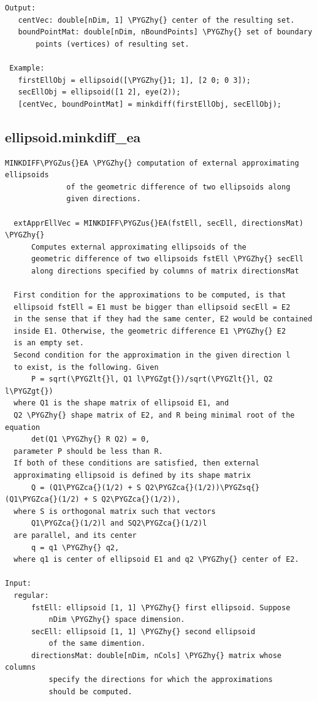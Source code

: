 \documentclass[letterpaper,10pt,english]{sphinxmanual}
\def\PYGZus{\char`\_}
\def\PYGZca{\char`\^}
\def\PYGZlt{\char`\<}
\def\PYGZgt{\char`\>}
\def\PYGZhy{\char`\-}
\def\PYGZsq{\char`\'}
\begin{document}
\begin{Verbatim}[commandchars=\\\{\}]
 Output:
   centVec: double[nDim, 1] \PYGZhy{} center of the resulting set.
   boundPointMat: double[nDim, nBoundPoints] \PYGZhy{} set of boundary
       points (vertices) of resulting set.

 Example:
   firstEllObj = ellipsoid([\PYGZhy{}1; 1], [2 0; 0 3]);
   secEllObj = ellipsoid([1 2], eye(2));
   [centVec, boundPointMat] = minkdiff(firstEllObj, secEllObj);
\end{Verbatim}


\subsection{ellipsoid.minkdiff\_ea}
\label{chap_functions:ellipsoid-minkdiff-ea}
\begin{Verbatim}[commandchars=\\\{\}]
MINKDIFF\PYGZus{}EA \PYGZhy{} computation of external approximating ellipsoids
              of the geometric difference of two ellipsoids along
              given directions.

  extApprEllVec = MINKDIFF\PYGZus{}EA(fstEll, secEll, directionsMat) \PYGZhy{}
      Computes external approximating ellipsoids of the
      geometric difference of two ellipsoids fstEll \PYGZhy{} secEll
      along directions specified by columns of matrix directionsMat

  First condition for the approximations to be computed, is that
  ellipsoid fstEll = E1 must be bigger than ellipsoid secEll = E2
  in the sense that if they had the same center, E2 would be contained
  inside E1. Otherwise, the geometric difference E1 \PYGZhy{} E2
  is an empty set.
  Second condition for the approximation in the given direction l
  to exist, is the following. Given
      P = sqrt(\PYGZlt{}l, Q1 l\PYGZgt{})/sqrt(\PYGZlt{}l, Q2 l\PYGZgt{})
  where Q1 is the shape matrix of ellipsoid E1, and
  Q2 \PYGZhy{} shape matrix of E2, and R being minimal root of the equation
      det(Q1 \PYGZhy{} R Q2) = 0,
  parameter P should be less than R.
  If both of these conditions are satisfied, then external
  approximating ellipsoid is defined by its shape matrix
      Q = (Q1\PYGZca{}(1/2) + S Q2\PYGZca{}(1/2))\PYGZsq{} (Q1\PYGZca{}(1/2) + S Q2\PYGZca{}(1/2)),
  where S is orthogonal matrix such that vectors
      Q1\PYGZca{}(1/2)l and SQ2\PYGZca{}(1/2)l
  are parallel, and its center
      q = q1 \PYGZhy{} q2,
  where q1 is center of ellipsoid E1 and q2 \PYGZhy{} center of E2.

Input:
  regular:
      fstEll: ellipsoid [1, 1] \PYGZhy{} first ellipsoid. Suppose
          nDim \PYGZhy{} space dimension.
      secEll: ellipsoid [1, 1] \PYGZhy{} second ellipsoid
          of the same dimention.
      directionsMat: double[nDim, nCols] \PYGZhy{} matrix whose columns
          specify the directions for which the approximations
          should be computed.


\end{Verbatim}
\end{document}
